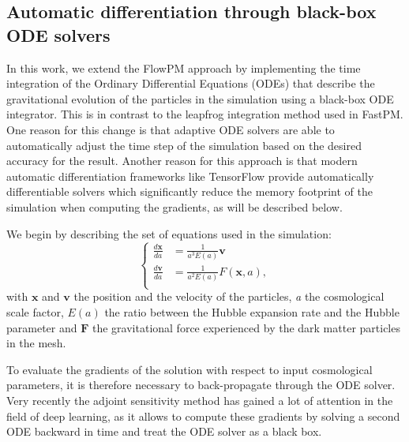 \documentclass{aa}
\begin{document}
\subsection{Automatic differentiation through black-box ODE solvers}\label{Backpropagation_of_ODE_solutions}
In this work, we extend the FlowPM approach by implementing the time integration of the Ordinary Differential Equations
(ODEs) that describe the gravitational evolution of the particles in the simulation using a black-box ODE integrator. This is in contrast to the leapfrog integration method used in FastPM. One reason for this change is that adaptive ODE solvers are able to automatically adjust the time step of the simulation based on the desired accuracy for the result. Another reason for this approach is that modern automatic differentiation frameworks like TensorFlow provide automatically differentiable solvers which significantly reduce the memory footprint of the simulation when computing the gradients, as will be described below.


We begin by describing the set of equations used in the simulation:
\begin{equation}
    \left\{ \begin{array}{ll}
        \frac{d \mathbf{x}}{d a} & = \frac{1}{a^3 E(a)} \mathbf{v} \\
        \frac{d \mathbf{v}}{d a} & =  \frac{1}{a^2 E(a)} F(\mathbf{x}, a), \\
    \end{array} \right.
\end{equation}
with $\mathbf{x}$ and $\mathbf{v}$ the position and the velocity of the particles, \textit{a} the cosmological scale factor, $E(a)$ the ratio between the Hubble expansion rate and the Hubble parameter and $\mathbf{F}$ the gravitational force experienced by the dark matter particles in the mesh.

To evaluate the gradients of the solution with respect to input cosmological parameters, it is therefore necessary to  back-propagate through the ODE solver. Very recently the adjoint sensitivity method \cite{chen2018neural, pontryaginmathematical} has gained a lot of attention in the field of deep learning, as it allows to compute these gradients by solving a second ODE backward in time and treat the ODE solver as a black box. 
 
\end{document}
